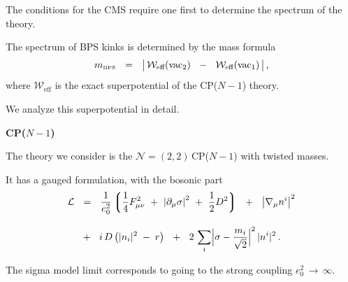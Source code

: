 \documentclass[12pt,letterpaper,landscape,KOMA,smallheadings,calcdimensions,display]{powersem}
\newcommand{\ntt}{${\mathcal N}=(2,2)\,$}
\newcommand{\cell}{{\mathcal L}}
\newcommand{\pt}{\partial}
\newcommand{\mbps}{m_{\text{\tiny BPS}}}
\newcommand{\W}{\mathcal{W}}
\newcommand{\sectionfont}{
\usefont{OT1}{lmvtt}{b}{n}\fontsize{45pt}{30pt}\selectfont
\bfseries}
\begin{document}
\begin{slide}
\vspace*{2cm}

The conditions for the CMS require one first to determine the spectrum of the theory.

The spectrum of BPS kinks is determined by the mass formula 
\[
	\mbps ~~=~~ \big|\, \W_\text{eff} ( \text{vac}_2 ) ~~-~~ \W_\text{eff} ( \text{vac}_1 ) \,\big|\,\text{,}
\]
where $ \W_\text{eff} $ is the exact superpotential of the CP($N-1$) theory.

We analyze this superpotential in detail.

\end{slide}


\begin{slide}

\vspace*{3.0cm} 
\begin{center}
\sectionfont
	CP($N-1$)
\end{center}
\vspace*{2.0cm} 


\end{slide}


\begin{slide}


\vspace*{1.0cm}
	The theory we consider is the \ntt CP($N-1$) with twisted masses.

	It has a gauged formulation, with the bosonic part
\begin{align*}
%
\cell & ~~=~~ 
	\frac{1}{e_0^2} \lgr \frac{1}{4} F_{\mu\nu}^2 ~+~ \left|\pt_\mu\sigma\right|^2 ~+~ \frac{1}{2}D^2 \rgr
 	~~+~~ \left|\nabla_\mu n^i\right|^2 
	\\[3mm]
%
&
	~~+~~ i\,D\left( |n_i|^2 \;-\; r \right)
	~~+~~ 2\,\sum_i \Bigl| \sigma-\frac{m_i}{\sqrt 2} \Bigr|^2\, |n^i|^2\,\text{.}
\end{align*}

	The sigma model limit corresponds to going to the strong coupling $ e_0^2 \,\to\, \infty $.

\end{slide}
\end{document}
